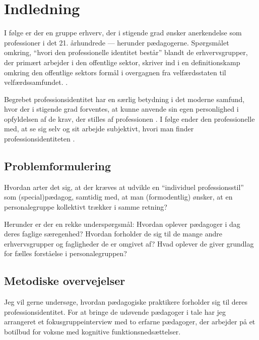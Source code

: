 \section{Indledning}

I følge \citeauthor{hansbolKonstruktionAfProfessionel2008} er der en gruppe erhverv, der i stigende grad ønsker anerkendelse som professioner i det 21. århundrede — herunder pædagogerne.
Spørgsmålet omkring, “hvori den professionelle identitet består” blandt de erhvervsgrupper, der primært arbejder i den offentlige sektor, skriver \citeauthor{hansbolKonstruktionAfProfessionel2008} ind i en definitionskamp omkring den offentlige sektors formål i overgagnen fra velfærdsstaten til velfærdssamfundet.
\autocite[s. 19]{hansbolKonstruktionAfProfessionel2008}.

Begrebet professionsidentitet har en særlig betydning i det moderne samfund, hvor der i stigende grad forventes, at kunne anvende sin egen personlighed i opfyldelsen af de krav, der stilles af professionen \autocite{hansbolKonstruktionAfProfessionel2008}. I følge \citeauthor{mik-meyerIndledningSkabeProfessionel2012} ender den professionelle med, at se sig selv og sit arbejde subjektivt, hvori man finder professionsidentiteten \autocite[s. 458]{mik-meyerIndledningSkabeProfessionel2012}.

\subsection{Problemformulering}

Hvordan arter det sig, at der kræves at udvikle en “individuel professionsstil” som (special)pædagog, samtidig med, at man (formodentlig) ønsker, at en personalegruppe kollektivt trækker i samme retning?

Herunder er der en rekke underspørgsmål:
Hvordan oplever pædagoger i dag deres faglige særegenhed?
Hvordan forholder de sig til de mange andre erhvervsgrupper og fagligheder de er omgivet af?
Hvad oplever de giver grundlag for fælles forståelse i personalegruppen?

\subsection{Metodiske overvejelser}

Jeg vil gerne undersøge, hvordan pædagogiske praktikere forholder sig til deres professionsidentitet.
For at bringe de udøvende pædagoger i tale har jeg arrangeret et fokusgruppeinterview med to erfarne pædagoger, der arbejder på et botilbud for voksne med kognitive funktionsnedsættelser.

